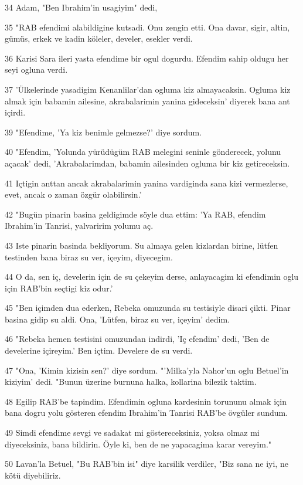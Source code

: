 \par 34 Adam, "Ben Ibrahim'in usagiyim" dedi,
\par 35 "RAB efendimi alabildigine kutsadi. Onu zengin etti. Ona davar, sigir, altin, gümüs, erkek ve kadin köleler, develer, esekler verdi.
\par 36 Karisi Sara ileri yasta efendime bir ogul dogurdu. Efendim sahip oldugu her seyi ogluna verdi.
\par 37 'Ülkelerinde yasadigim Kenanlilar'dan ogluma kiz almayacaksin. Ogluma kiz almak için babamin ailesine, akrabalarimin yanina gideceksin' diyerek bana ant içirdi.
\par 39 "Efendime, 'Ya kiz benimle gelmezse?' diye sordum.
\par 40 "Efendim, 'Yolunda yürüdügüm RAB melegini seninle gönderecek, yolunu açacak' dedi, 'Akrabalarimdan, babamin ailesinden ogluma bir kiz getireceksin.
\par 41 Içtigin anttan ancak akrabalarimin yanina vardiginda sana kizi vermezlerse, evet, ancak o zaman özgür olabilirsin.'
\par 42 "Bugün pinarin basina geldigimde söyle dua ettim: 'Ya RAB, efendim Ibrahim'in Tanrisi, yalvaririm yolumu aç.
\par 43 Iste pinarin basinda bekliyorum. Su almaya gelen kizlardan birine, lütfen testinden bana biraz su ver, içeyim, diyecegim.
\par 44 O da, sen iç, develerin için de su çekeyim derse, anlayacagim ki efendimin oglu için RAB'bin seçtigi kiz odur.'
\par 45 "Ben içimden dua ederken, Rebeka omuzunda su testisiyle disari çikti. Pinar basina gidip su aldi. Ona, 'Lütfen, biraz su ver, içeyim' dedim.
\par 46 "Rebeka hemen testisini omuzundan indirdi, 'Iç efendim' dedi, 'Ben de develerine içireyim.' Ben içtim. Develere de su verdi.
\par 47 "Ona, 'Kimin kizisin sen?' diye sordum. "'Milka'yla Nahor'un oglu Betuel'in kiziyim' dedi. "Bunun üzerine burnuna halka, kollarina bilezik taktim.
\par 48 Egilip RAB'be tapindim. Efendimin ogluna kardesinin torununu almak için bana dogru yolu gösteren efendim Ibrahim'in Tanrisi RAB'be övgüler sundum.
\par 49 Simdi efendime sevgi ve sadakat mi göstereceksiniz, yoksa olmaz mi diyeceksiniz, bana bildirin. Öyle ki, ben de ne yapacagima karar vereyim."
\par 50 Lavan'la Betuel, "Bu RAB'bin isi" diye karsilik verdiler, "Biz sana ne iyi, ne kötü diyebiliriz.
